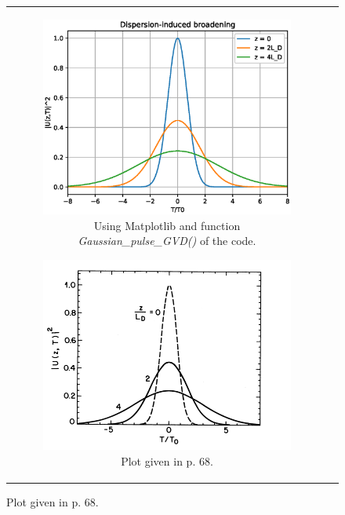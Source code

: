         \begin{figure}[label={fig:gvdmtp}, caption={Effect of GVD in a Gaussian pulse following Eq. \eqref{eq_ugvdg}.}]
        \centering
        \begin{tabular}[c]{cc}
        \centering
        \begin{subfigure}[b]{.53\textwidth}
		    \centering	
            \includegraphics[width=1\textwidth]{figures/chap3/gvdonlygaus.eps}
            \caption{Using Matplotlib and function \emph{Gaussian\_pulse\_GVD()} of the code.}\label{fig:gvdmtp1}
        \end{subfigure}
        \hfill
        \begin{subfigure}[b]{.53\textwidth}
		    \centering	
            \includegraphics[width=1\textwidth]{figures/chap3/gvdgausagr.png}
            \caption{Plot given in \citep{AgrawalBook} p. 68.}\label{fig:gvdmtp2}
        \end{subfigure}
        \end{tabular}
        \end{figure}
        
